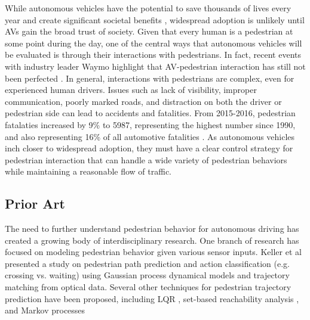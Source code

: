 \documentclass[letterpaper, 10 pt, conference]{ieeeconf}  %
\begin{document}
While autonomous vehicles have the potential to save thousands of lives every year and create significant societal benefits \cite{Fagnant2015}, widespread adoption is unlikely until AVs gain the broad trust of society. Given that every human is a pedestrian at some point during the day, one of the central ways that autonomous vehicles will be evaluated is through their interactions with pedestrians. In fact, recent events with industry leader Waymo highlight that AV-pedestrian interaction has still not been perfected \cite{MattRichtelandConorDougherty2015}. In general, interactions with pedestrians are complex, even for experienced human drivers. Issues such as lack of visibility, improper communication, poorly marked roads, and distraction on both the driver or pedestrian side can lead to accidents and fatalities. From 2015-2016, pedestrian fatalaties increased by 9\% to 5987, representing the highest number since 1990, and also representing 16\% of all automotive fatalities \cite{HighwayTrafficSafetyAdministration2016}. As autonomous vehicles inch closer to widespread adoption, they must have a clear control strategy for pedestrian interaction that can handle a wide variety of pedestrian behaviors while maintaining a reasonable flow of traffic.    

\subsection{Prior Art}

The need to further understand pedestrian behavior for autonomous driving has created a growing body of interdisciplinary research. One branch of research has focused on modeling pedestrian behavior given various sensor inputs. Keller et al \cite{Keller2014} presented a study on pedestrian path prediction and action classification (e.g. crossing vs. waiting) using Gaussian process dynamical models and trajectory matching from optical data. Several other techniques for pedestrian trajectory prediction have been proposed, including LQR \cite{Batkovic}, set-based reachability analysis \cite{Koschi2018}, and Markov processes \cite{Karasev2016} 
\end{document}
